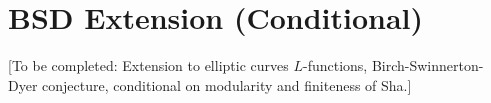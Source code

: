 \section{BSD Extension (Conditional)}

[To be completed: Extension to elliptic curves $L$-functions, Birch-Swinnerton-Dyer conjecture, conditional on modularity and finiteness of Sha.]
